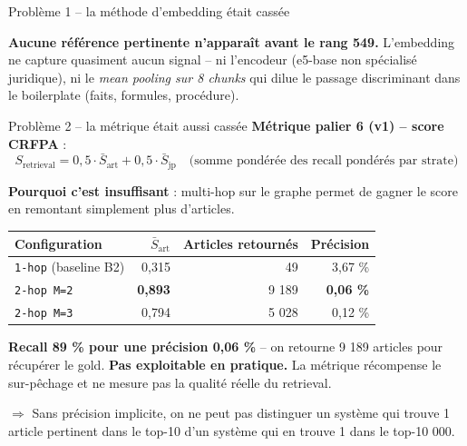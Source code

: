 \documentclass[aspectratio=169,10pt]{beamer}
\newcommand{\warnbox}[1]{%
  \begin{center}
  \colorbox{red!10}{\parbox{0.92\linewidth}{\centering #1}}
  \end{center}}
\begin{document}
\begin{frame}{Problème 1 -- la méthode d'embedding était cassée}
  \vspace{0.4em}
  \warnbox{\textbf{Aucune référence pertinente n'apparaît avant le rang 549.}
  L'embedding ne capture quasiment aucun signal -- ni l'encodeur (e5-base
  non spécialisé juridique), ni le \emph{mean pooling sur 8 chunks} qui dilue
  le passage discriminant dans le boilerplate (faits, formules, procédure).}
\end{frame}

\begin{frame}{Problème 2 -- la métrique était aussi cassée}
  \footnotesize
  \textbf{Métrique palier 6 (v1) -- score CRFPA} :
  \[ S_{\text{retrieval}} = 0{,}5 \cdot \bar{S}_{\text{art}} + 0{,}5 \cdot \bar{S}_{\text{jp}}
   \quad \text{(somme pondérée des recall pondérés par strate)} \]

  \vspace{0.5em}
  \textbf{Pourquoi c'est insuffisant} : multi-hop sur le graphe permet de
  \og gagner \fg{} le score en remontant simplement plus d'articles.

  \vspace{0.3em}
  \renewcommand{\arraystretch}{1.2}
  \begin{center}
  \begin{tabular}{@{}l r r r@{}}
    \toprule
    \textbf{Configuration} & \textbf{$\bar{S}_{\text{art}}$} & \textbf{Articles retournés} & \textbf{Précision} \\
    \midrule
    \texttt{1-hop} (baseline B2)   & 0,315          & 49    & 3,67 \% \\
    \texttt{2-hop M=2}             & \textbf{0,893} & 9 189 & \textcolor{warn}{\textbf{0,06 \%}} \\
    \texttt{2-hop M=3}             & 0,794          & 5 028 & 0,12 \% \\
    \bottomrule
  \end{tabular}
  \end{center}

  \vspace{0.5em}
  \warnbox{\textbf{Recall 89 \% pour une précision 0,06 \%} -- on retourne 9 189
  articles pour récupérer le gold. \textbf{Pas exploitable en pratique.}
  La métrique récompense le sur-pêchage et ne mesure pas la qualité réelle du retrieval.}

  \vspace{0.4em}
  $\Rightarrow$ Sans précision implicite, on ne peut pas distinguer un système qui
  trouve 1 article pertinent dans le top-10 d'un système qui en trouve 1 dans le top-10 000.
\end{frame}
\end{document}
